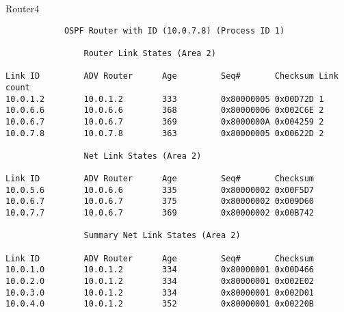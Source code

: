 Router4
\begin{lstlisting}
            OSPF Router with ID (10.0.7.8) (Process ID 1)                       
                                                                                
                Router Link States (Area 2)                                     
                                                                                
Link ID         ADV Router      Age         Seq#       Checksum Link count      
10.0.1.2        10.0.1.2        333         0x80000005 0x00D72D 1               
10.0.6.6        10.0.6.6        368         0x80000006 0x002C6E 2               
10.0.6.7        10.0.6.7        369         0x8000000A 0x004259 2               
10.0.7.8        10.0.7.8        363         0x80000005 0x00622D 2               
                                                                                
                Net Link States (Area 2)                                        
                                                                                
Link ID         ADV Router      Age         Seq#       Checksum                 
10.0.5.6        10.0.6.6        335         0x80000002 0x00F5D7                 
10.0.6.7        10.0.6.7        375         0x80000002 0x009D60                 
10.0.7.7        10.0.6.7        369         0x80000002 0x00B742                 
                                                                                
                Summary Net Link States (Area 2)                                
                                                                                
Link ID         ADV Router      Age         Seq#       Checksum                 
10.0.1.0        10.0.1.2        334         0x80000001 0x00D466                 
10.0.2.0        10.0.1.2        334         0x80000001 0x002E02                 
10.0.3.0        10.0.1.2        334         0x80000001 0x002D01                 
10.0.4.0        10.0.1.2        352         0x80000001 0x00220B
\end{lstlisting}
